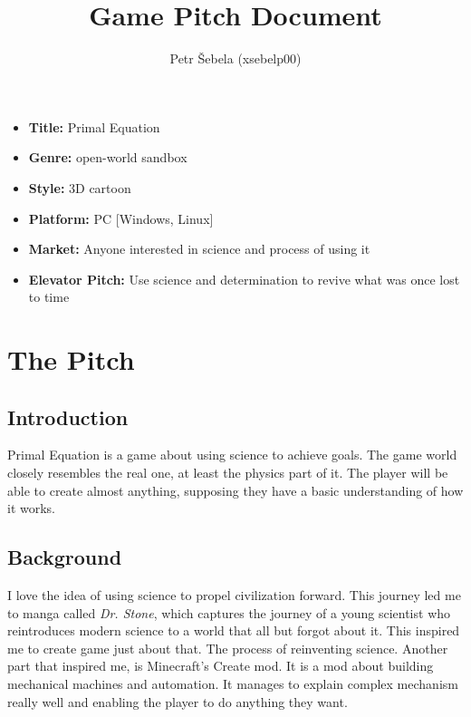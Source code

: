 \documentclass[a4paper,10pt,english]{article}
\title{%
Game Pitch Document%
}
\author{%
Petr Šebela (xsebelp00)%
}
\date{}
\begin{document}
\maketitle
\thispagestyle{empty}

{%
\large

\begin{itemize}

\item[] \textbf{Title:} Primal Equation

\item[] \textbf{Genre:} open-world sandbox

\item[] \textbf{Style:} 3D cartoon

\item[] \textbf{Platform:} PC [Windows, Linux]

\item[] \textbf{Market:} Anyone interested in science and process of using it

\item[] \textbf{Elevator Pitch:} Use science and determination to revive what was once lost to time

\end{itemize}

}

\section*{\centering The Pitch}

\subsection*{Introduction}
Primal Equation is a game about using science to achieve goals. The game world closely resembles the real one, at least the physics part of it. The player will be able to create almost anything, supposing they have a basic understanding of how it works.

\subsection*{Background}
I love the idea of using science to propel civilization forward. This journey led me to manga called \textit{Dr. Stone}, which captures the journey of a young scientist who reintroduces modern science to a world that all but forgot about it. This inspired me to create game just about that. The process of reinventing science. Another part that inspired me, is Minecraft's Create mod. It is a mod about building mechanical machines and automation. It manages to explain complex mechanism really well and enabling the player to do anything they want.
\end{document}
